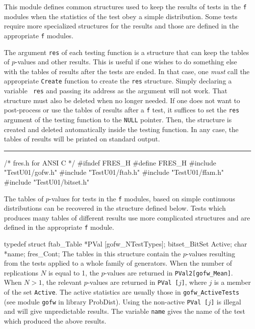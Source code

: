 
This module defines common structures used to keep the results of tests
in the {\tt f} modules when the statistics of the test obey a
simple distribution. Some tests require more specialized structures for
the results and those are defined in the appropriate {\tt f} modules.

The argument {\tt res} of each testing function is a structure 
 that can keep the tables of $p$-values and other results.
This is useful if one wishes to do something else with the tables of
results after the tests are ended. In that case, one 
{\it must} call the appropriate {\tt Create} function to create the
 {\tt res} structure. Simply declaring a variable  {\tt
res} and passing its address as the argument will not work.
That structure must also be deleted when no longer needed. If one does not
want to post-process or use the tables of results after a {\tt f} test,
it suffices to set the {\tt res} argument of the testing function
to the {\tt NULL} pointer.
Then, the structure is created and deleted automatically inside the 
testing function. In any case, the tables of results will be printed on 
standard output.

\bigskip
\hrule
\code
\hide
/* fres.h for ANSI C */
#ifndef FRES_H
#define FRES_H
\endhide
#include "TestU01/gofw.h"
#include "TestU01/ftab.h"
#include "TestU01/ffam.h"
#include "TestU01/bitset.h"
\endcode





The tables of $p$-values for tests in the {\tt f} modules, based on simple
continuous distributions can be recovered in the structure defined below.
Tests which produces many tables of different results use more complicated
structures and are defined in the appropriate {\tt f} module.

\code


typedef struct {
   ftab_Table *PVal [gofw_NTestTypes];
   bitset_BitSet Active;
   char *name;
} fres_Cont;
\endcode
 \tab
  The tables in this structure contain the $p$-values resulting from
  the tests applied to a whole family of generators.
  When the number of replications $N$ is equal to 1, the $p$-values
  are returned in {\tt PVal2[gofw\_Mean]}. When $N > 1$, the relevant
  $p$-values are returned in {\tt PVal [$j$]}, where  $j$ is a member
  of the set {\tt Active}. The active statistics are usually those
  in {\tt gofw\_ActiveTests} (see module {\tt gofw} in library
  ProbDist). Using the non-active {\tt PVal [$j$]} is illegal and will
  give unpredictable results. The variable 
 {\tt name} gives the name of the test which produced the above results.
 \endtab
\code


